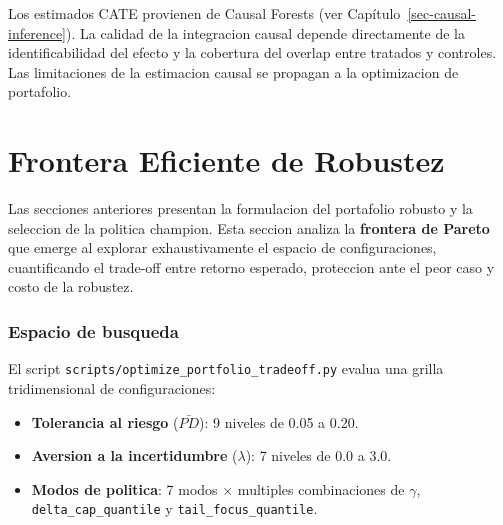 \documentclass[
  spanish,
  11pt,
  letterpaper,
]{scrbook}
\providecommand{\tightlist}{%
  \setlength{\itemsep}{0pt}\setlength{\parskip}{0pt}}
\theoremstyle{plain}
\theoremstyle{remark}
\begin{document}
\begin{tcolorbox}[enhanced jigsaw, arc=.35mm, bottomrule=.15mm, bottomtitle=1mm, breakable, colback=white, colbacktitle=quarto-callout-note-color!10!white, colframe=quarto-callout-note-color-frame, coltitle=black, left=2mm, leftrule=.75mm, opacityback=0, opacitybacktitle=0.6, rightrule=.15mm, title=\textcolor{quarto-callout-note-color}{\faInfo}\hspace{0.5em}{Conexion con inferencia causal}, titlerule=0mm, toprule=.15mm, toptitle=1mm]

Los estimados CATE provienen de Causal Forests (ver
Capítulo~\ref{sec-causal-inference}). La calidad de la integracion
causal depende directamente de la identificabilidad del efecto y la
cobertura del overlap entre tratados y controles. Las limitaciones de la
estimacion causal se propagan a la optimizacion de portafolio.

\end{tcolorbox}

\chapter{Frontera Eficiente de Robustez}\label{sec-efficient-frontier}

Las secciones anteriores presentan la formulacion del portafolio robusto
y la seleccion de la politica champion. Esta seccion analiza la
\textbf{frontera de Pareto} que emerge al explorar exhaustivamente el
espacio de configuraciones, cuantificando el trade-off entre retorno
esperado, proteccion ante el peor caso y costo de la robustez.

\subsection{Espacio de busqueda}\label{espacio-de-busqueda}

El script \texttt{scripts/optimize\_portfolio\_tradeoff.py} evalua una
grilla tridimensional de configuraciones:

\begin{itemize}
\tightlist
\item
  \textbf{Tolerancia al riesgo} (\(\bar{PD}\)): 9 niveles de 0.05 a
  0.20.
\item
  \textbf{Aversion a la incertidumbre} (\(\lambda\)): 7 niveles de 0.0 a
  3.0.
\item
  \textbf{Modos de politica}: 7 modos \(\times\) multiples combinaciones
  de \(\gamma\), \texttt{delta\_cap\_quantile} y
  \texttt{tail\_focus\_quantile}.
\end{itemize}
\end{document}
